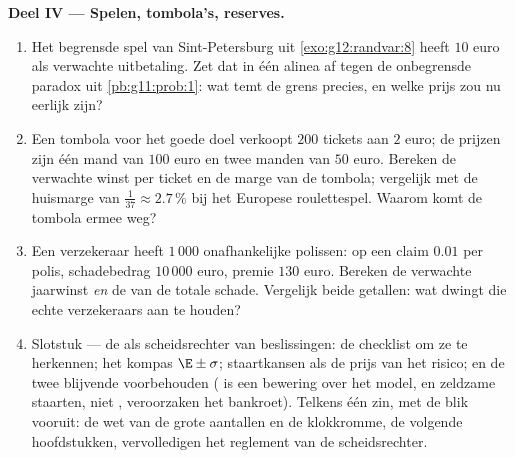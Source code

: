 \begin{problem}
\medskip
\noindent\textbf{Deel IV --- Spelen, tombola's, reserves.}
\begin{enumerate}[resume]
  \item Het begrensde spel van Sint-Petersburg uit \cref{exo:g12:randvar:8}
        heeft $10$ euro als verwachte uitbetaling. Zet dat in één alinea af
        tegen de onbegrensde paradox uit \cref{pb:g11:prob:1}: wat temt de
        grens precies, en welke prijs zou nu eerlijk zijn?
  \item Een tombola voor het goede doel verkoopt $200$ tickets aan $2$ euro;
        de prijzen zijn één mand van $100$ euro en twee manden van $50$ euro.
        Bereken de verwachte winst per ticket en de marge van de tombola;
        vergelijk met de huismarge van $\frac{1}{37} \approx 2.7\,\%$ bij het
        Europese roulettespel. Waarom komt de tombola ermee weg?
  \item Een verzekeraar heeft $1\,000$ onafhankelijke polissen:  op een
        claim $0.01$ per polis, schadebedrag $10\,000$ euro, premie $130$
        euro. Bereken de verwachte jaarwinst \emph{en} de 
        van de totale schade. Vergelijk beide getallen: wat dwingt die
         echte verzekeraars aan te houden?
  \item Slotstuk --- de  als scheidsrechter van
        beslissingen: de checklist om ze te herkennen; het kompas
        $\E \pm \sigma$; staartkansen als de prijs van het risico; en de twee
        blijvende voorbehouden ( is een bewering over het
        model, en zeldzame staarten, niet , veroorzaken het
        bankroet). Telkens één zin, met de blik vooruit: de wet van de grote
        aantallen en de klokkromme, de volgende hoofdstukken, vervolledigen
        het reglement van de scheidsrechter.
\end{enumerate}
\end{problem}
